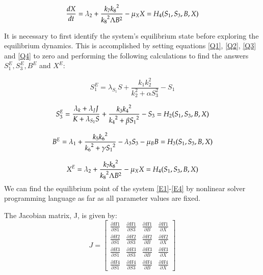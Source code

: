 \begin{equation}
\label{Q4}
    \frac{dX}{dt}= \lambda_2+ \frac{k_7{k_8}^2}{{k_8}^2\Lambda B^2} -\mu_XX = H_4(S_1,S_3,B,X) \\
\end{equation}

It is necessary to first identify the system's equilibrium state before exploring the equilibrium dynamics. This is accomplished by setting equations \eqref{Q1}, \eqref{Q2}, \eqref{Q3} and \eqref{Q4} to zero and performing the following calculations to find the answers $S_1^E, S_3^E, B^E$ and $X^E$:

\begin{equation}
\label{E1}
    S_1^E = \lambda_{S_1} S + \frac{ k_1k_2^2} {k_2^2+\alpha S_3^2} - S_1
\end{equation}

\begin{equation}
\label{E2}
S_3^E = \frac{\lambda_k+\lambda_JJ} {K+ \lambda_{S_2} S} +\frac{k_3{k_4}^2}{{k_4}^2+\beta{S_1}^2}-S_3  = H_2(S_1,S_3,B,X)\\
\end{equation}

\begin{equation}
\label{E3}
B^E = \lambda_1+ \frac{k_5{k_6}^2}{{k_6}^2+\gamma{S_1}^2} -  \lambda_3 S_3 - \mu_BB = H_3(S_1,S_3,B,X)  \\
\end{equation}

\begin{equation}
\label{E4}
    X^E= \lambda_2+ \frac{k_7{k_8}^2}{{k_8}^2\Lambda B^2} -\mu_XX = H_4(S_1,S_3,B,X) \\
\end{equation}
We can find the equilibrium point of the system \eqref{E1}-\eqref{E4} by nonlinear solver programming language as far as
all parameter values are fixed. 

The Jacobian matrix, J, is given by:
\begin{equation}
\label{s1}
    J = \begin{bmatrix}
\frac{\partial H1}{\partial S1} & \frac{\partial H1}{\partial S3} & \frac{\partial H1}{\partial B} & \frac{\partial H1}{\partial X} \\
\frac{\partial H2}{\partial S1} & \frac{\partial H2}{\partial S3} & \frac{\partial H2}{\partial B} & \frac{\partial H2}{\partial X} \\
\frac{\partial H3}{\partial S1} & \frac{\partial H3}{\partial S3} & \frac{\partial H3}{\partial B} & \frac{\partial H3}{\partial X} \\
\frac{\partial H4}{\partial S1} & \frac{\partial H4}{\partial S3} & \frac{\partial H4}{\partial B} & \frac{\partial H4}{\partial X}
\end{bmatrix}
\end{equation}

